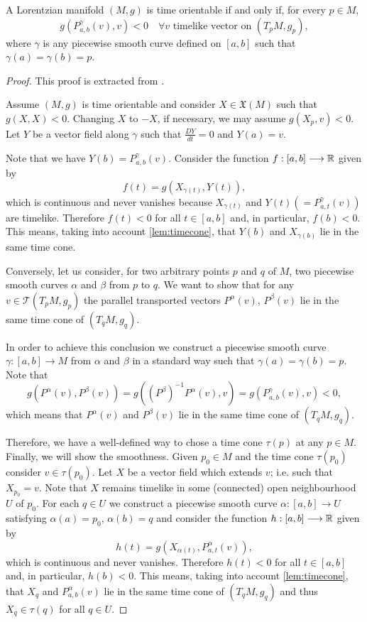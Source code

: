 \begin{corollary}
	\label{cor:timeorientable2}
	A Lorentzian manifold $(M,g)$ is time orientable if and only if, for every $p \in M$,
	\[
	g(P^\gamma_{a,b}(v), v) < 0 \quad \forall v \textrm{ timelike vector on } (T_pM, g_p),
	\]
	where $\gamma$ is any piecewise smooth curve defined on $[a,b]$ such that $\gamma(a) = \gamma(b) = p$.
\end{corollary}

\begin{proof}
	This proof is extracted from \cite[p. 202]{romero10}.
	
	Assume $(M,g)$ is time orientable and consider $X \in \mathfrak{X}(M)$ such that $g(X,X)<0$. Changing $X$ to $-X$, if necessary, we may assume $g(X_p,v)<0$. Let $Y$ be a vector field along $\gamma$ such that $\frac{DY}{dt}=0$ and $Y(a)=v$.
	
	Note that we have $Y(b)=P_{a,b}^{\gamma}(v)$. Consider the function $f : [a,b] \longrightarrow \mathbb{R}$ given by
	\[
	f(t)= g(X_{\gamma(t)},Y(t)),
	\]
	which is continuous and never vanishes because $X_{\gamma(t)}$ and $Y(t)(=P_{a,t}^{\gamma}(v))$ are timelike. Therefore $f(t)<0$ for all $t\in [a,b]$ and, in particular, $f(b)<0$. This means, taking into account \autoref{lem:timecone}, that $Y(b)$ and $X_{\gamma(b)}$ lie in the same time cone.
	
	Conversely, let us consider, for two arbitrary points $p$ and $q$ of $M$, two piecewise smooth curves $\alpha$ and $\beta$ from $p$ to $q$. We want to show that for any $v\in \mathcal{T}(T_pM,g_p)$ the parallel transported vectors $P^{\alpha}(v)$, $P^{\beta}(v)$ lie in the same time cone of $(T_qM,g_q)$.
	
	In order to achieve this conclusion we construct a piecewise smooth curve $\gamma : [a,b] \longrightarrow M$ from $\alpha$ and $\beta$ in a standard way such that $\gamma(a)=\gamma(b)=p$. Note that $$g(P^{\alpha}(v),P^{\beta}(v))=g((P^{\beta})^{-1}P^{\alpha}(v),v)=g(P_{a,b}^{\gamma}(v),v)<0,$$ which means that $P^{\alpha}(v)$ and $P^{\beta}(v)$ lie in the same time cone of $(T_qM,g_q)$.
	
	Therefore, we have a well-defined way to chose a time cone $\tau(p)$ at any $p \in M$. Finally, we will show the smoothness. Given $p_0 \in M$ and the time cone $\tau(p_0)$ consider $v \in \tau(p_0)$. Let $X$ be a vector field which extends $v$; i.e. such that $X_{p_{0}}=v$. Note that $X$ remains timelike in some (connected) open neighbourhood $U$ of $p_0$. For each $q \in U$ we construct a piecewise smooth curve $\alpha : [a,b] \longrightarrow U$ satisfying $\alpha(a)=p_0$,
	$\alpha(b)=q$ and consider the function $h : [a,b] \longrightarrow \mathbb{R}$ given by
	\[
	h(t)=g(X_{\alpha(t)},P_{a,t}^{\alpha}(v)),
	\]
	which is continuous and never vanishes. Therefore $h(t)<0$ for all $t\in [a,b]$ and, in particular, $h(b)<0$. This means, taking into account \autoref{lem:timecone}, that $X_q$ and $P_{a,b}^{\alpha}(v)$ lie in the same time cone of $(T_qM,g_q)$ and thus $X_q \in \tau(q)$ for all $q \in U$.
\end{proof}

